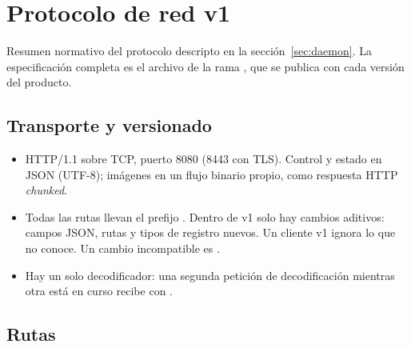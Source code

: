 \chapter{Protocolo de red v1}
\label{anx:protocolo}

Resumen normativo del protocolo descripto en la sección~\ref{sec:daemon}. La
especificación completa es el archivo  de la rama
, que se publica con cada versión del producto.

\section{Transporte y versionado}

\begin{itemize}
  \item HTTP/1.1 sobre TCP, puerto 8080 (8443 con TLS). Control y estado en
    JSON (UTF-8); imágenes en un flujo binario propio, como respuesta HTTP
    \emph{chunked}.
  \item Todas las rutas llevan el prefijo . Dentro de v1 solo hay
    cambios aditivos: campos JSON, rutas y tipos de registro nuevos. Un
    cliente v1 ignora lo que no conoce. Un cambio incompatible es .
  \item Hay un solo decodificador: una segunda petición de decodificación mientras
    otra está en curso recibe  con .
\end{itemize}

\section{Rutas}

